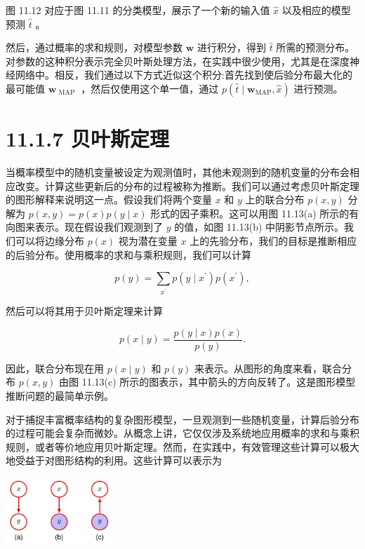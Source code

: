 \documentclass[10pt]{report}
\begin{document}
图 11.12 对应于图 11.11 的分类模型，展示了一个新的输入值 \(\widehat{x}\) 以及相应的模型预测 \(\widehat{t}\) 。

然后，通过概率的求和规则，对模型参数 \(\mathbf{w}\) 进行积分，得到 \(\widehat{t}\) 所需的预测分布。对参数的这种积分表示完全贝叶斯处理方法，在实践中很少使用，尤其是在深度神经网络中。相反，我们通过以下方式近似这个积分:首先找到使后验分布最大化的最可能值 \({\mathbf{w}}_{\text{ MAP }}\) ，然后仅使用这个单一值，通过 \(p\left( {\widehat{t} \mid  {\mathbf{w}}_{\mathrm{{MAP}}},\widehat{x}}\right)\) 进行预测。

\section*{11.1.7 贝叶斯定理}

当概率模型中的随机变量被设定为观测值时，其他未观测到的随机变量的分布会相应改变。计算这些更新后的分布的过程被称为推断。我们可以通过考虑贝叶斯定理的图形解释来说明这一点。假设我们将两个变量 \(x\) 和 \(y\) 上的联合分布 \(p\left( {x,y}\right)\) 分解为 \(p\left( {x,y}\right)  = p\left( x\right) p\left( {y \mid  x}\right)\) 形式的因子乘积。这可以用图 11.13(a) 所示的有向图来表示。现在假设我们观测到了 \(y\) 的值，如图 11.13(b) 中阴影节点所示。我们可以将边缘分布 \(p\left( x\right)\) 视为潜在变量 \(x\) 上的先验分布，我们的目标是推断相应的后验分布。使用概率的求和与乘积规则，我们可以计算

\[
p\left( y\right)  = \mathop{\sum }\limits_{{x}^{\prime }}p\left( {y \mid  {x}^{\prime }}\right) p\left( {x}^{\prime }\right) , \tag{11.20}
\]

然后可以将其用于贝叶斯定理来计算

\[
p\left( {x \mid  y}\right)  = \frac{p\left( {y \mid  x}\right) p\left( x\right) }{p\left( y\right) }. \tag{11.21}
\]

因此，联合分布现在用 \(p\left( {x \mid  y}\right)\) 和 \(p\left( y\right)\) 来表示。从图形的角度来看，联合分布 \(p\left( {x,y}\right)\) 由图 11.13(c) 所示的图表示，其中箭头的方向反转了。这是图形模型推断问题的最简单示例。

对于捕捉丰富概率结构的复杂图形模型，一旦观测到一些随机变量，计算后验分布的过程可能会复杂而微妙。从概念上讲，它仅仅涉及系统地应用概率的求和与乘积规则，或者等价地应用贝叶斯定理。然而，在实践中，有效管理这些计算可以极大地受益于对图形结构的利用。这些计算可以表示为

\begin{center}
\includegraphics[max width=0.3\textwidth]{images/0194e279-9b28-703a-88f4-c3ac21e2010d_356_956_344_419_262_0.jpg}
\end{center}
\hspace*{3em} 
\end{document}
